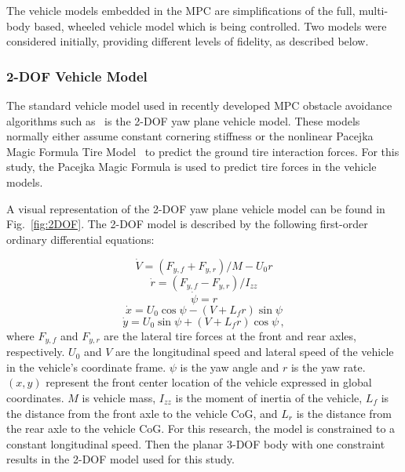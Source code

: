 \documentclass[12pt,onecolumn]{article}
\newcommand{\CHRONO}{{\sffamily{{Chrono}}}}
\begin{document}
The vehicle models embedded in the MPC are simplifications of the full, multi-body based, {\CHRONO} wheeled vehicle model which is being controlled.  Two models were considered initially, providing different levels of fidelity, as described below.


\subsubsection{2-DOF Vehicle Model}\label{sss:2DOFModel}
The standard vehicle model used in recently developed MPC obstacle avoidance algorithms such as~\cite{ModelFidelity2016} is the 2-DOF yaw plane vehicle model. These models normally either assume constant cornering stiffness or the nonlinear Pacejka Magic Formula Tire Model~\cite{Pacejka1997} to predict the ground tire interaction forces. For this study, the Pacejka Magic Formula is used to predict tire forces in the vehicle models.   


A visual representation of the 2-DOF yaw plane vehicle model can be found in Fig.~\ref{fig:2DOF}. The 2-DOF model is described by the following first-order ordinary differential equations:

\begin{equation}\label{e:2DOF_Vdot}
\dot{V} = \left(F_{y,f} + F_{y,r}\right)/{M - U_0r} 
\end{equation}
\begin{equation}\label{e:2DOF_rdot}
\dot{r} = \left(F_{y,f} - F_{y,r}\right)/I_{zz}
\end{equation}
\begin{equation}\label{e:2DOF_psidot}
\dot{\psi} = r 
\end{equation}
\begin{equation}\label{e:2DOF_xdot}
\dot{x} = U_0\cos{\psi}-\left(V+L_fr\right)\sin{\psi}
\end{equation}
\begin{equation}\label{e:2DOF_ydot}
\dot{y} = U_0\sin{\psi}+\left(V+L_fr\right)\cos{\psi} \,,
\end{equation}
%
where $F_{y,f}$ and $F_{y,r}$ are the lateral tire forces at the front and rear axles, respectively. $U_0$ and $V$ are the longitudinal speed and lateral speed of the vehicle in the vehicle's coordinate frame. $\psi$ is the yaw angle and $r$ is the yaw rate. $\left(x,y\right)$ represent the front center location of the vehicle expressed in global coordinates. $M$ is vehicle mass, $I_{zz}$ is the moment of inertia of the vehicle, $L_f$ is the distance from the front axle to the vehicle CoG, and $L_r$ is the distance from the rear axle to the vehicle CoG. For this research, the model is constrained to a constant longitudinal speed. Then the planar 3-DOF body with one constraint results in the 2-DOF model used for this study.
\end{document}
